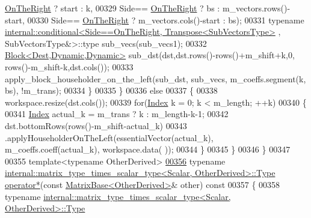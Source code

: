 \begin{DoxyCode}
      \hyperlink{group__enums_ggac22de43beeac7a78b384f99bed5cee0ba99dc75d8e00b6c3a5bdc31940f47492b}{OnTheRight} ? start : k,
00329                                                                    Side==
      \hyperlink{group__enums_ggac22de43beeac7a78b384f99bed5cee0ba99dc75d8e00b6c3a5bdc31940f47492b}{OnTheRight} ? bs : m\_vectors.rows()-start,
00330                                                                    Side==
      \hyperlink{group__enums_ggac22de43beeac7a78b384f99bed5cee0ba99dc75d8e00b6c3a5bdc31940f47492b}{OnTheRight} ? m\_vectors.cols()-start : bs);
00331           \textcolor{keyword}{typename} 
      \hyperlink{struct_eigen_1_1internal_1_1conditional}{internal::conditional<Side==OnTheRight, Transpose<SubVectorsType>}
      , SubVectorsType&>::type sub\_vecs(sub\_vecs1);
00332           \hyperlink{group___core___module_class_eigen_1_1_block}{Block<Dest,Dynamic,Dynamic>} sub\_dst(dst,dst.rows()-rows()+m\_shift+k,0,
       rows()-m\_shift-k,dst.cols());
00333           apply\_block\_householder\_on\_the\_left(sub\_dst, sub\_vecs, m\_coeffs.segment(k, bs), !m\_trans);
00334         \}
00335       \}
00336       \textcolor{keywordflow}{else}
00337       \{
00338         workspace.resize(dst.cols());
00339         \textcolor{keywordflow}{for}(\hyperlink{group___core___module_a554f30542cc2316add4b1ea0a492ff02}{Index} k = 0; k < m\_length; ++k)
00340         \{
00341           \hyperlink{group___core___module_a554f30542cc2316add4b1ea0a492ff02}{Index} actual\_k = m\_trans ? k : m\_length-k-1;
00342           dst.bottomRows(rows()-m\_shift-actual\_k)
00343             .applyHouseholderOnTheLeft(essentialVector(actual\_k), m\_coeffs.coeff(actual\_k), workspace.data(
      ));
00344         \}
00345       \}
00346     \}
00347 
00355     \textcolor{keyword}{template}<\textcolor{keyword}{typename} OtherDerived>
\hyperlink{group___householder___module_ac57e5a22f1646e04a4f8b4cba3825928}{00356}     \textcolor{keyword}{typename} \hyperlink{group___core___module_class_eigen_1_1_matrix}{internal::matrix\_type\_times\_scalar\_type<Scalar, OtherDerived>::Type}
       \hyperlink{group___householder___module_ac57e5a22f1646e04a4f8b4cba3825928}{operator*}(\textcolor{keyword}{const} \hyperlink{group___core___module_class_eigen_1_1_matrix_base}{MatrixBase<OtherDerived>}& other)\textcolor{keyword}{ const}
00357 \textcolor{keyword}{    }\{
00358       \textcolor{keyword}{typename} 
      \hyperlink{group___core___module_class_eigen_1_1_matrix}{internal::matrix\_type\_times\_scalar\_type<Scalar, OtherDerived>::Type}

\end{DoxyCode}
